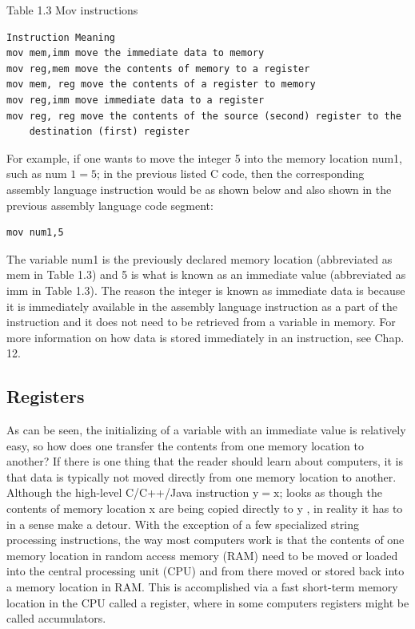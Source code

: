 \documentclass[10pt]{article}
\begin{document}
Table 1.3 Mov instructions

\begin{verbatim}
Instruction Meaning
mov mem,imm move the immediate data to memory
mov reg,mem move the contents of memory to a register
mov mem, reg move the contents of a register to memory
mov reg,imm move immediate data to a register
mov reg, reg move the contents of the source (second) register to the
    destination (first) register
\end{verbatim}

For example, if one wants to move the integer 5 into the memory location num1, such as num $1=5$; in the previous listed C code, then the corresponding assembly language instruction would be as shown below and also shown in the previous assembly language code segment:

\begin{verbatim}
mov num1,5
\end{verbatim}

The variable num1 is the previously declared memory location (abbreviated as mem in Table 1.3) and 5 is what is known as an immediate value (abbreviated as imm in Table 1.3). The reason the integer is known as immediate data is because it is immediately available in the assembly language instruction as a part of the instruction and it does not need to be retrieved from a variable in memory. For more information on how data is stored immediately in an instruction, see Chap. 12.

\subsection*{Registers}
As can be seen, the initializing of a variable with an immediate value is relatively easy, so how does one transfer the contents from one memory location to another? If there is one thing that the reader should learn about computers, it is that data is typically not moved directly from one memory location to another. Although the high-level C/C++/Java instruction $\mathrm{y}=\mathrm{x}$; looks as though the contents of memory location x are being copied directly to y , in reality it has to in a sense make a detour. With the exception of a few specialized string processing instructions, the way most computers work is that the contents of one memory location in random access memory (RAM) need to be moved or loaded into the central processing unit (CPU) and from there moved or stored back into a memory location in RAM. This is accomplished via a fast short-term memory location in the CPU called a register, where in some computers registers might be called accumulators.
\end{document}
